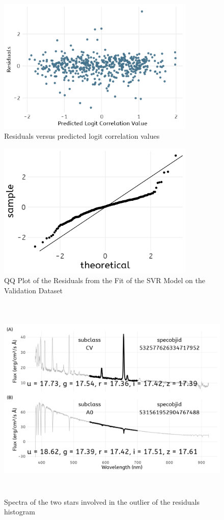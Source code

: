 \documentclass[preprint, 3p,
authoryear]{elsarticle} %
\begin{document}
\begin{figure}
\centering
  \includegraphics[width=\columnwidth, height = 6.5cm, width = 10cm]{figures/residuals-predicted}
    \caption{Residuals versus predicted logit correlation values}
    \label{fig:residuals-pred}
\end{figure}

\begin{figure}
\centering
  \includegraphics[width=\columnwidth, height = 6.5cm, width = 10cm]{figures/residuals-qq}
    \caption{QQ Plot of the Residuals from the Fit of the SVR Model on the Validation Dataset}
    \label{fig:residuals-qq}
\end{figure}

\begin{figure}
  \centering
  \includegraphics[width=\columnwidth, height = 10cm, width = 10cm]{figures/outlier-spectra}
    \caption{Spectra of the two stars involved in the outlier of the residuals histogram}
    \label{fig:outlier-spectra}
\end{figure}
\end{document}
